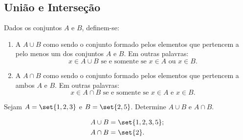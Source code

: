 \subsection{União e Interseção}

\begin{definition}
Dados os conjuntos $A$ e $B$, definem-se:

\begin{enumerate}
	\item A  $A \cup B$ como sendo o conjunto formado pelos elementos que pertencem a pelo menos um dos conjuntos $A$ e $B$. Em outras palavras:
		$$ x \in A \cup B \text{ se e somente se } x \in A \text{ ou } x \in B. $$
	\item A  $A \cap B$ como sendo o conjunto formado pelos elementos que pertencem a ambos $A$ e $B$. Em outras palavras:
		$$ x \in A \cap B \text{ se e somente se } x \in A \text{ e } x \in B. $$
\end{enumerate}
\end{definition}

\begin{example}
Sejam $A = \set{1, 2, 3}$ e $ B = \set{2,5}$. Determine $A \cup B$ e $A \cap B$.
\end{example}

\begin{solution}
\begin{align*}
	&A \cup B = \set{1,2,3,5};\\
	&A \cap B = \set{2}.\\
\end{align*}
\end{solution}

